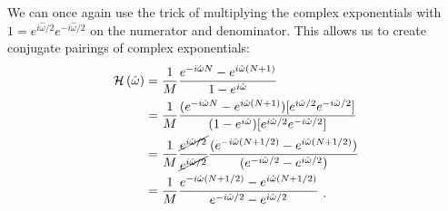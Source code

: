 We can once again use the trick of multiplying the complex
exponentials with $1=e^{i\hat{\omega}/2}e^{-i\hat{\omega}/2}$ on the
numerator and denominator. This allows us to create conjugate pairings
of complex exponentials:
\begin{align}
    \mathcal{H}\left(\hat{\omega}\right) & = \frac{1}{M} \frac{e^{-i\hat{\omega}N}-e^{i \hat{\omega}(N+1)}}{1-e^{i\hat{\omega}}}                                                                                                          \\
        & = \frac{1}{M} \frac{(e^{-i\hat{\omega}N}-e^{i \hat{\omega}(N+1)})[e^{i\hat{\omega}/2}e^{-i\hat{\omega}/2}] }{(1-e^{i\hat{\omega}})[e^{i\hat{\omega}/2}e^{-i\hat{\omega}/2}] }                  \\
        & = \frac{1}{M} \frac{\cancel{e^{i\hat{\omega}/2}}}{\cancel{e^{i\hat{\omega}/2}}} \frac{  (e^{-i\hat{\omega}(N+1/2)}-e^{i \hat{\omega}(N+1/2)}) }{(e^{-i\hat{\omega}/2} -e^{i\hat{\omega}/2} ) } \\
        & = \frac{1}{M} \frac{ e^{-i\hat{\omega}(N+1/2)}-e^{i \hat{\omega}(N+1/2)} }{e^{-i\hat{\omega}/2} -e^{i\hat{\omega}/2}  } \,\, _,
\end{align}
